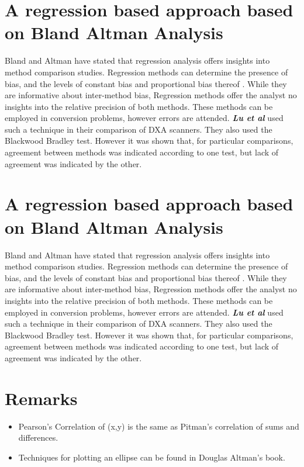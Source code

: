 \documentclass[12pt, a4paper]{report}
\theoremstyle{plain}
\theoremstyle{definition}
\theoremstyle{remark}
\begin{document}
\section{A regression based approach based on Bland Altman Analysis}
Bland and Altman have stated that regression analysis offers insights into method comparison studies. Regression methods can determine the presence of bias, and the levels of constant bias and proportional bias thereof \cite{ludbrook97,ludbrook02}.
While they are informative about inter-method bias, Regression methods offer the analyst no insights into the relative precision of both methods. These methods can be employed in conversion problems, however errors are
attended.
\emph{\textbf{Lu et al}} used such a technique in their comparison of DXA scanners. They also used the Blackwood Bradley test. However it was shown that, for particular comparisons, agreement between methods was indicated according to one test, but lack of agreement was indicated by the other.



\section{A regression based approach based on Bland Altman Analysis}
Bland and Altman have stated that regression analysis offers insights into method comparison studies. Regression methods can determine the presence of bias, and the levels of constant bias and proportional bias thereof \cite{ludbrook97,ludbrook02}.
While they are informative about inter-method bias, Regression methods offer the analyst no insights into the relative precision of both methods. These methods can be employed in conversion problems, however errors are
attended.
\emph{\textbf{Lu et al}} used such a technique in their comparison of DXA scanners. They also used the Blackwood Bradley test. However it was shown that, for particular comparisons, agreement between methods was indicated according to one test, but lack of agreement was indicated by the other.


\section*{Remarks}
\begin{itemize}
	\item Pearson's Correlation of (x,y) is the same as Pitman's correlation of sums and differences.
	
	\item Techniques for plotting an ellipse can be found in Douglas Altman's book.
\end{itemize}
\end{document}
